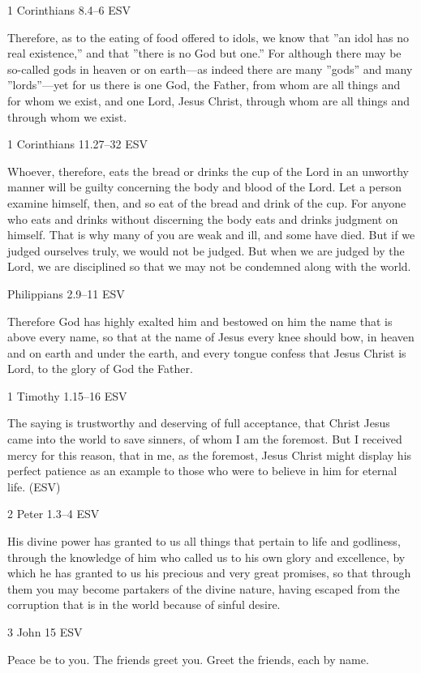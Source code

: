 \documentclass[
]{article}
\newcommand{\RL}[1]{\beginR #1\endR}
\begin{document}
1 Corinthians 8.4--6 ESV

Therefore, as to the eating of food offered to idols, we know that
\RL{''}an idol has no real existence,'' and that \RL{''}there is no God
but one.'' For although there may be so-called gods in heaven or on
earth---as indeed there are many \RL{''}gods'' and many
\RL{''}lords''---yet for us there is one God, the Father, from whom are
all things and for whom we exist, and one Lord, Jesus Christ, through
whom are all things and through whom we exist.

1 Corinthians 11.27--32 ESV

Whoever, therefore, eats the bread or drinks the cup of the Lord in an
unworthy manner will be guilty concerning the body and blood of the
Lord. Let a person examine himself, then, and so eat of the bread and
drink of the cup. For anyone who eats and drinks without discerning the
body eats and drinks judgment on himself. That is why many of you are
weak and ill, and some have died. But if we judged ourselves truly, we
would not be judged. But when we are judged by the Lord, we are
disciplined so that we may not be condemned along with the world.

Philippians 2.9--11 ESV

Therefore God has highly exalted him and bestowed on him the name that
is above every name, so that at the name of Jesus every knee should bow,
in heaven and on earth and under the earth, and every tongue confess
that Jesus Christ is Lord, to the glory of God the Father.

1 Timothy 1.15--16 ESV

The saying is trustworthy and deserving of full acceptance, that Christ
Jesus came into the world to save sinners, of whom I am the foremost.
But I received mercy for this reason, that in me, as the foremost, Jesus
Christ might display his perfect patience as an example to those who
were to believe in him for eternal life. (ESV)

2 Peter 1.3--4 ESV

His divine power has granted to us all things that pertain to life and
godliness, through the knowledge of him who called us to his own glory
and excellence, by which he has granted to us his precious and very
great promises, so that through them you may become partakers of the
divine nature, having escaped from the corruption that is in the world
because of sinful desire.

3 John 15 ESV

Peace be to you. The friends greet you. Greet the friends, each by name.
\end{document}
